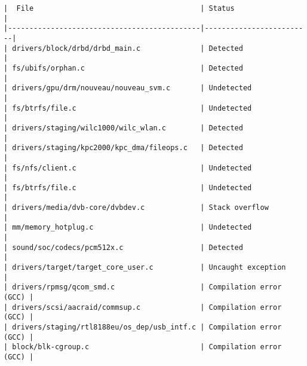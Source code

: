 \begin{verbatim}
|  File                                       | Status                  | 
|---------------------------------------------|-------------------------|
| drivers/block/drbd/drbd_main.c              | Detected                | 
| fs/ubifs/orphan.c                           | Detected                | 
| drivers/gpu/drm/nouveau/nouveau_svm.c       | Undetected              | 
| fs/btrfs/file.c                             | Undetected              | 
| drivers/staging/wilc1000/wilc_wlan.c        | Detected                | 
| drivers/staging/kpc2000/kpc_dma/fileops.c   | Detected                | 
| fs/nfs/client.c                             | Undetected              | 
| fs/btrfs/file.c                             | Undetected              | 
| drivers/media/dvb-core/dvbdev.c             | Stack overflow          | 
| mm/memory_hotplug.c                         | Undetected              | 
| sound/soc/codecs/pcm512x.c                  | Detected                | 
| drivers/target/target_core_user.c           | Uncaught exception      | 
| drivers/rpmsg/qcom_smd.c                    | Compilation error (GCC) | 
| drivers/scsi/aacraid/commsup.c              | Compilation error (GCC) | 
| drivers/staging/rtl8188eu/os_dep/usb_intf.c | Compilation error (GCC) | 
| block/blk-cgroup.c                          | Compilation error (GCC) | 
\end{verbatim}
